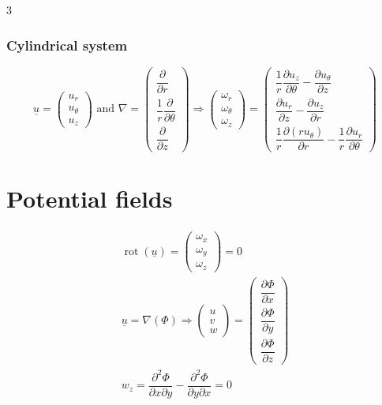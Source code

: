\documentclass[9pt, landscape, a4paper]{article}
\DeclareMathOperator{\rot}{rot}
\begin{document}
\begin{multicols*}{3}
\subsubsection{Cylindrical system}
\begin{equation*}
  \underline{u} =
  \begin{pmatrix}
    u_r\\
    u_\theta\\
    u_z
  \end{pmatrix}
  \text{ and }
  \nabla =
  \begin{pmatrix}
    \dfrac{\partial}{\partial r}\\[1.5ex]
    \dfrac{1}{r}\dfrac{\partial}{\partial \theta}\\[1.5ex]
    \dfrac{\partial}{\partial z}
  \end{pmatrix} \Rightarrow
  \begin{pmatrix}
    \omega_r\\
    \omega_\theta\\
    \omega_z
  \end{pmatrix}
  =
  \begin{pmatrix}
    \dfrac{1}{r}\dfrac{\partial u_z}{\partial \theta} - \dfrac{\partial u_\theta}{\partial z}\\[1.5ex]
    \dfrac{\partial u_r}{\partial z} - \dfrac{\partial u_z}{\partial r}\\[1.5ex]
    \dfrac{1}{r}\dfrac{\partial\left(r u_\theta\right)}{\partial r} - \dfrac{1}{r}\dfrac{\partial u_r}{\partial \theta}
  \end{pmatrix}
\end{equation*}

\section{Potential fields}
\begin{gather*}
  \rot(\underline{u}) =
  \begin{pmatrix}
    \omega_x \\ \omega_y \\ \omega_z
  \end{pmatrix}
  = 0\\
  \underline{u} = \nabla(\Phi) \Longrightarrow
  \begin{pmatrix}
    u\\v\\w
  \end{pmatrix}
  =
  \begin{pmatrix}
    \dfrac{\partial \Phi}{\partial x}\\[1.5ex]
    \dfrac{\partial \Phi}{\partial y}\\[1.5ex]
    \dfrac{\partial \Phi}{\partial z}
  \end{pmatrix}\\
  w_z = \dfrac{\partial^2\Phi}{\partial x \partial y} - \dfrac{\partial^2\Phi}{\partial y \partial x} = 0
\end{gather*}


\end{multicols*}
\end{document}
